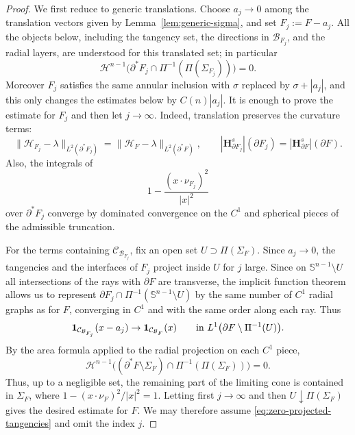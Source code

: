 \documentclass[reqno,11pt]{amsart}
\newcommand{\HH}{\mathscr H}
\numberwithin{equation}{section}
\theoremstyle{remark}
\begin{document}
\begin{proof}
We first reduce to generic translations. Choose
$a_j\to0$ among the translation vectors given by
Lemma~\ref{lem:generic-sigma}, and set $F_j:=F-a_j$. 
All the objects below,
including the tangency set, the directions in $\mathcal B_{F_j}$, and the
radial layers, are understood for this translated set; in particular
\begin{equation}\label{eq:zero-projected-tangencies}
\HH^{n-1}\bigl(\partial^*F_j\cap\Pi^{-1}(\Pi(\Sigma_{F_j}))\bigr)=0.
\end{equation}
Moreover $F_j$ satisfies the same annular inclusion with
$\sigma$ replaced by $\sigma+|a_j|$, and this only changes the estimates below
by $C(n)|a_j|$.
It is enough to prove the estimate for $F_j$ and then let $j\to\infty$. Indeed,
translation preserves the curvature terms:
\[
\|\mathcal H_{F_j}-\lambda\|_{L^2(\partial^*F_j)}
=\|\mathcal H_F-\lambda\|_{L^2(\partial^*F)},\qquad
|\mathbf H^s_{\partial F_j}|(\partial F_j)
=|\mathbf H^s_{\partial F}|(\partial F).
\]
Also, the integrals of
\[
1-\frac{(x\cdot\nu_{F_j})^2}{|x|^2}
\]
over $\partial^*F_j$ converge by dominated convergence on the $C^1$ and
spherical pieces of the admissible truncation. 

For the terms containing $\mathcal C_{\mathcal B_{F_j}}$, fix an
open set $U\supset\Pi(\Sigma_F)$. Since $a_j\to0$, the tangencies and the
interfaces of $F_j$ project inside $U$ for $j$ large. Since on
$\mathbb S^{n-1}\setminus U$ all intersections of the rays with $\partial F$
are transverse, the implicit function theorem allows us to represent
$\partial F_j\cap\Pi^{-1}(\mathbb S^{n-1}\setminus U)$ by the same number of
$C^1$ radial graphs as for $F$, converging in $C^1$ and with the same order
along each ray. Thus
\[
\mathbf 1_{\mathcal C_{\mathcal B_{F_j}}}(x-a_j)
\to
\mathbf 1_{\mathcal C_{\mathcal B_F}}(x)
\qquad\hbox{in }L^1\bigl(\partial F\setminus\Pi^{-1}(U)\bigr).
\]
By the area formula applied to the radial projection on each $C^1$ piece,
\[
\HH^{n-1}\bigl((\partial^*F\setminus\Sigma_F)
\cap\Pi^{-1}(\Pi(\Sigma_F))\bigr)=0.
\]
Thus, up to a negligible set, the remaining part of the limiting cone is
contained in $\Sigma_F$, where
$1-(x\cdot\nu_F)^2/|x|^2=1$. Letting first $j\to\infty$ and then
$U\downarrow\Pi(\Sigma_F)$ gives the desired estimate for $F$. We may therefore
assume \eqref{eq:zero-projected-tangencies} and omit the index $j$.


\end{proof}
\end{document}
